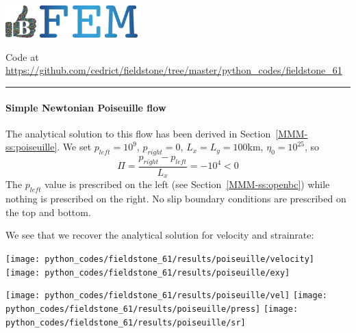 \includegraphics[height=1.25cm]{images/pictograms/benchmark}
\includegraphics[height=1.25cm]{images/pictograms/FEM}




\begin{center}
Code at \url{https://github.com/cedrict/fieldstone/tree/master/python_codes/fieldstone_61}
\end{center}

\par\noindent\rule{\textwidth}{0.4pt}

\paragraph{Simple Newtonian Poiseuille flow} The analytical solution to this flow has been derived 
in Section~\ref{MMM-ss:poiseuille}.
We set $p_{left}=10^9$, $p_{right}=0$, $L_x=L_y=100$km, $\eta_0=10^{25}$, so 
\[
\Pi=\frac{p_{right}-p_{left}}{L_x}=-10^4 <0
\]
The $p_{left}$ value is prescribed on the left (see Section~\ref{MMM-ss:openbc}) while 
nothing is prescribed on the right. No slip boundary conditions are 
prescribed on the top and bottom.

We see that we recover the analytical solution for velocity and strainrate:
\begin{center}
\texttt{[image: python\_codes/fieldstone\_61/results/poiseuille/velocity]}
\texttt{[image: python\_codes/fieldstone\_61/results/poiseuille/exy]}
\end{center}

\begin{center}
\texttt{[image: python\_codes/fieldstone\_61/results/poiseuille/vel]}
\texttt{[image: python\_codes/fieldstone\_61/results/poiseuille/press]}
\texttt{[image: python\_codes/fieldstone\_61/results/poiseuille/sr]}
\end{center}

